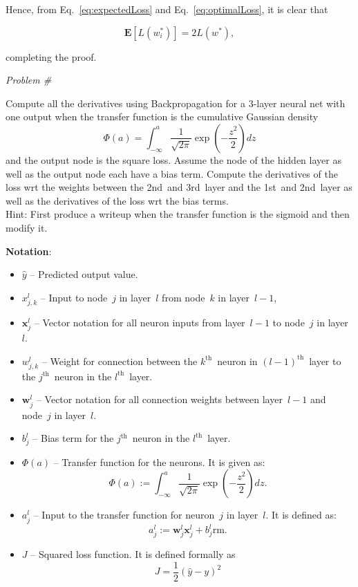 \documentclass{report}
\newcounter{problemCount}
\newenvironment{problemshell}{
  \par%
  \medskip
  \leftskip=0pt\rightskip=0pt%
}
{
  \par\medskip
}
\newenvironment{problem}
{%
  \stepcounter{problemCount}
  \begin{problemshell}
    \noindent \textit{Problem \#\arabic{problemCount}} \\
    \bfseries  
}
{
  \end{problemshell}
}
\newcommand{\problemspace}{\\[0.4em]}
\newcommand{\w}{\mathbf{w}}
\newcommand{\xvec}{\mathbf{x}}
\newcommand{\yhat}{\hat{y}}
\begin{document}
  Hence, from Eq.~\eqref{eq:expectedLoss} and Eq.~\eqref{eq:optimalLoss}, it is clear that 
  
  \[\mathbf{E}[L(w_{i}^{*})] = 2L(w^{*}), \]
  
  \noindent
  completing the proof.

  \newpage
  \begin{problem}
    Compute all the derivatives using Backpropagation for a 3-layer neural net with one output when the transfer function is the cumulative Gaussian density
    \[\Phi(a) = \int_{-\infty}^{a}\frac{1}{\sqrt{2\pi}} \exp\left( -\frac{z^2}{2}\right) dz\]
    \noindent
    and the output node is the square loss.  Assume the node of the hidden layer as well as the output node each have a bias term.  Compute the derivatives of the loss wrt the weights between the 2nd~and 3rd~layer and the 1st~and 2nd~layer as well as the derivatives of the loss wrt the bias terms.
    \problemspace
    Hint: First produce a writeup when the transfer function is the sigmoid and then modify it.
  \end{problem}

  \textbf{Notation}: 
  \begin{itemize}
    \item $\yhat$ -- Predicted output value.
    \item $x_{j,k}^{l}$ -- Input to node~$j$ in layer~$l$ from node~$k$ in layer~$l-1$,
    \item $\xvec_{j}^{l}$ -- Vector notation for all neuron inputs from layer~$l-1$ to node~$j$ in layer~$l$.
    \item $w_{j,k}^{l}$ -- Weight for connection between the ${k^{\text{th}}}$~neuron in ${(l-1)^{\text{th}}}$~layer to the ${j^{\text{th}}}$~neuron in the ${l^{\text{th}}}$~layer.
    \item $\w_{j}^{l}$ -- Vector notation for all connection weights between layer~$l-1$ and node~$j$ in layer~$l$.
    \item $b_{j}^{l}$ -- Bias term for the ${j^{\text{th}}}$~neuron in the $l^{\text{th}}$~layer.
    \item $\Phi(a)$ -- Transfer function for the neurons.  It is given as:
    \begin{equation}
      \Phi(a) :=\int_{-\infty}^{a}\frac{1}{\sqrt{2\pi}} \exp\left( -\frac{z^{2}}{2} \right)dz\label{eq:transferFunction} \textrm{.}
    \end{equation}
    \item $a_{j}^{l}$ -- Input to the transfer function for neuron~$j$ in layer~$l$.  It is defined as:
    \begin{equation}
      a_{j}^{l} := \w_{j}^{l} \xvec_{j}^{l} + b_{j}^{l}\text{rm}.
    \end{equation}
    \item $J$ -- Squared loss function.  It is defined formally as 
    \begin{equation}
      J = \frac{1}{2} (\yhat -y)^2
    \end{equation}
  \end{itemize}
  
\end{document}
